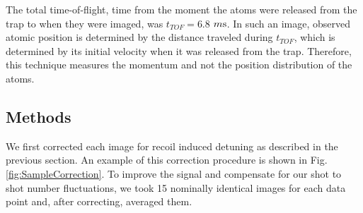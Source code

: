 \documentclass[12pt]{iopart}
\begin{document}
\par The total time-of-flight, time from the moment the atoms were released from the trap to when they were imaged, was $t_{TOF}=6.8$ $m\rm{s}$. In such an image, observed atomic position is determined by the distance traveled during $t_{TOF}$, which is determined by its initial velocity when it was released from the trap. Therefore, this technique measures the momentum and not the position distribution of the atoms. 
\subsection{Methods}
\par We first corrected each image for recoil induced detuning as described in the previous section. An example of this correction procedure is shown in Fig. \ref{fig:SampleCorrection}.  To improve the signal and compensate for our shot to shot number fluctuations, we took 15 nominally identical images for each data point and, after correcting, averaged them.
\end{document}
